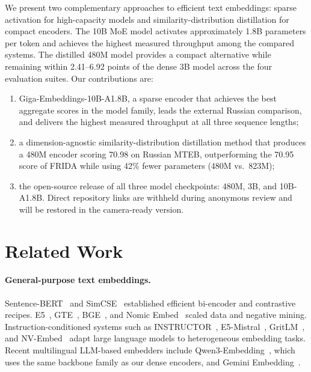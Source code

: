 \documentclass[11pt]{article}
\begin{document}
We present two complementary approaches to efficient text embeddings: sparse activation for high-capacity models and similarity-distribution distillation for compact encoders.
The 10B MoE model activates approximately 1.8B parameters per token and achieves the highest measured throughput among the compared systems.
The distilled 480M model provides a compact alternative while remaining within 2.41--6.92 points of the dense 3B model across the four evaluation suites.
Our contributions are:
\begin{enumerate}
  \item Giga-Embeddings-10B-A1.8B, a sparse encoder that achieves the best aggregate scores in the model family, leads the external Russian comparison, and delivers the highest measured throughput at all three sequence lengths;
  \item a dimension-agnostic similarity-distribution distillation method that produces a 480M encoder scoring 70.98 on Russian MTEB, outperforming the 70.95 score of FRIDA while using 42\% fewer parameters (480M vs.\ 823M);
  \item the open-source release of all three model checkpoints: 480M, 3B, and 10B-A1.8B. Direct repository links are withheld during anonymous review and will be restored in the camera-ready version.
\end{enumerate}

\section{Related Work}
\label{sec:related}

\paragraph{General-purpose text embeddings.}
Sentence-BERT~\citep{reimers2019sentence} and SimCSE~\citep{gao2021simcse} established efficient bi-encoder and contrastive recipes.
E5~\citep{wang2022text}, GTE~\citep{li2023towards}, BGE~\citep{xiao2023cpack}, and Nomic Embed~\citep{nussbaum2024nomic} scaled data and negative mining.
Instruction-conditioned systems such as INSTRUCTOR~\citep{su2023instructor}, E5-Mistral~\citep{wang2024improving}, GritLM~\citep{muennighoff2025gritlm}, and NV-Embed~\citep{lee2025nvembed} adapt large language models to heterogeneous embedding tasks.
Recent multilingual LLM-based embedders include Qwen3-Embedding~\citep{zhang2025qwen3embedding}, which uses the same backbone family as our dense encoders, and Gemini Embedding~\citep{lee2025gemini}.
\end{document}
